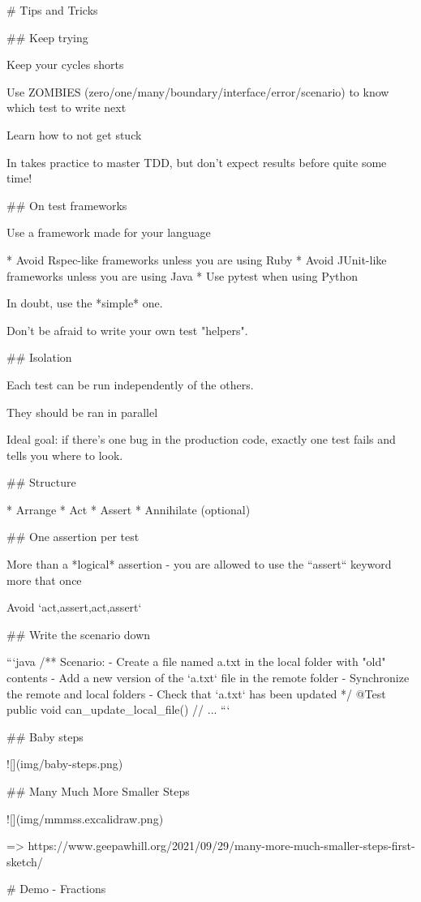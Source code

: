 # Tips and Tricks

## Keep trying

Keep your cycles shorts

Use ZOMBIES (zero/one/many/boundary/interface/error/scenario) to know
which test to write next

Learn how to not get stuck

In takes practice to master TDD, but don't expect results
before quite some time!


## On test frameworks

Use a framework made for your language

* Avoid Rspec-like frameworks unless you are using Ruby
* Avoid JUnit-like frameworks unless you are using Java
* Use pytest when using Python

In doubt, use the *simple* one.

Don't be afraid to write your own test "helpers".

## Isolation

Each test can be run independently of the others.

They should be ran in parallel

Ideal goal: if there's one bug in the production code, exactly one
test fails and tells you where to look.

## Structure

* Arrange
* Act
* Assert
* Annihilate (optional)

## One assertion per test

More than a *logical* assertion - you are allowed to use
the ``assert`` keyword more that once

Avoid `act,assert,act,assert`

## Write the scenario down

```java
/**
  Scenario:
  - Create a file named a.txt in the local folder with
    "old" contents
  - Add a new version of the `a.txt` file in the remote folder
  - Synchronize the remote and local folders
  - Check that `a.txt` has been updated
*/
@Test
public void can_update_local_file() {
    // ...
}
```

## Baby steps

![](img/baby-steps.png)

## Many Much More Smaller Steps

![](img/mmmss.excalidraw.png)

=> https://www.geepawhill.org/2021/09/29/many-more-much-smaller-steps-first-sketch/

# Demo - Fractions

